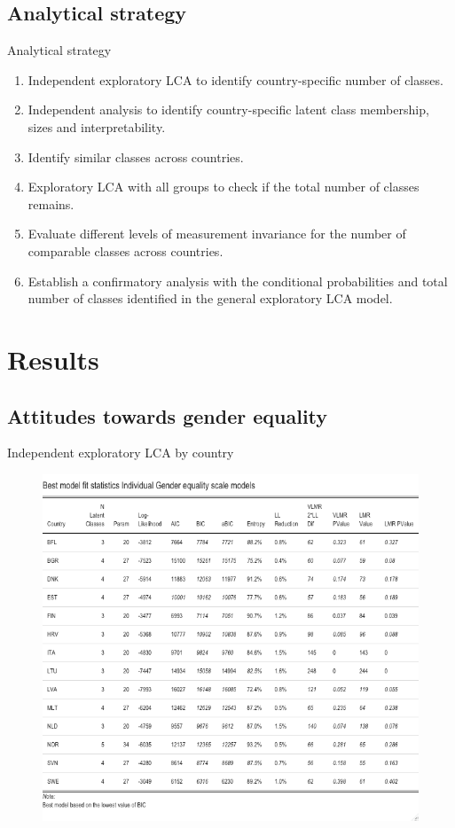 \documentclass[11pt,t]{beamer}
\begin{document}
\subsection{Analytical strategy}
\begin{frame}[c,plain]{Analytical strategy}

\vspace{-11pt}
\begin{enumerate}
\item Independent exploratory LCA to identify country-specific number of classes.
\item Independent analysis to identify country-specific latent class membership, sizes and interpretability.  
\item Identify similar classes across countries.
\item Exploratory LCA with all groups to check if the total number of classes remains.  
\item Evaluate different levels of measurement invariance for the number of comparable classes across countries.
\item Establish a confirmatory analysis with the conditional probabilities and total number of classes identified in the general exploratory LCA model. 
\end{enumerate}
\end{frame}

\section{Results}
\subsection{Attitudes towards gender equality}
\begin{frame}[c,plain]{Independent exploratory LCA by country}
\vspace{-11pt}
	
\begin{figure}
	\centering
	\includegraphics[height=0.7\textwidth]{graphics/countrymodelgender.png}
\end{figure}	
\end{frame} 
\end{document}
